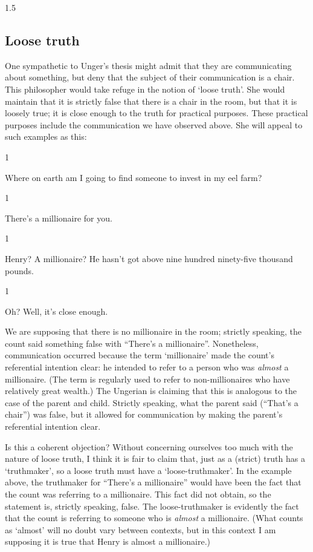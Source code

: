 \documentclass[11pt]{article}
\newcommand{\stage}[3]%
{%
	\begin{spacing}{1}%
	\vspace{0pt}
		\begin{description}[style=nextline, parsep=0pt, leftmargin=15mm, itemindent=-10mm, font=\mdseries]
			\item[\textsc{#1} \emph{#2}] #3
		\end{description}%
	\end{spacing}%
}
\begin{document}
\begin{spacing}{1.5}
\subsection{Loose truth}
\label{loose-u}
One sympathetic to Unger's thesis might admit that they are
communicating about something, but deny that the subject of their
communication is a chair.  This philosopher would take refuge in the
notion of `loose truth'.  She would maintain that it is strictly false
that there is a chair in the room, but that it is loosely true; it is
close enough to the truth for practical purposes.  These practical
purposes include the communication we have observed above.  She will
appeal to such examples as this:

\stage{Countess}{}{Where on earth am I going to find someone to invest
  in my eel farm?}

\stage{Count}{(pointing)}{There's a millionaire for you.}

\stage{Countess}{(incredulous)}{Henry? A millionaire? He hasn't got
  above nine hundred ninety-five thousand pounds.}

\stage{Count}{}{Oh? Well, it's close enough.}

We are supposing that there is no millionaire in the room; strictly
speaking, the count said something false with ``There's a
millionaire''.  Nonetheless, communication occurred because the term
`millionaire' made the count's referential intention clear: he
intended to refer to a person who was {\em almost} a millionaire.
(The term is regularly used to refer to non-millionaires who have
relatively great wealth.)  The Ungerian is claiming that this is
analogous to the case of the parent and child.  Strictly speaking,
what the parent said (``That's a chair'') was false, but it allowed
for communication by making the parent's referential intention clear.

Is this a coherent objection?  Without concerning ourselves too much
with the nature of loose truth, I think it is fair to claim that, just
as a (strict) truth has a `truthmaker', so a loose truth must have a
`loose-truthmaker'.  In the example above, the truthmaker for
``There's a millionaire'' would have been the fact that the count was
referring to a millionaire.  This fact did not obtain, so the
statement is, strictly speaking, false.  The loose-truthmaker is
evidently the fact that the count is referring to someone who is {\em
  almost} a millionaire.  (What counts as `almost' will no doubt vary
between contexts, but in this context I am supposing it is true that
Henry is almost a millionaire.)


\end{spacing}
\end{document}

